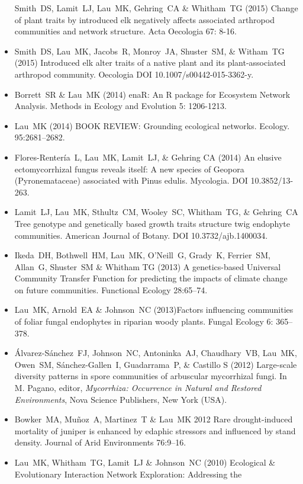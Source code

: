 \documentclass[a4paper]{article}
\begin{document}
\begin{itemize}
  Smith~DS, Lamit~LJ, Lau~MK, Gehring~CA \& Whitham~TG (2015) Change
  of plant traits by introduced elk negatively affects associated
  arthropod communities and network structure. Acta Oecologia 67: 8-16. 
\item 
  Smith~DS, Lau~MK, Jacobs~R, Monroy~JA, Shuster~SM, \& Witham~TG (2015)
  Introduced elk alter traits of a native plant and its plant-associated
  arthropod community. Oecologia DOI 10.1007/s00442-015-3362-y.
\item
  Borrett~SR \& Lau~MK (2014) enaR: An R package for Ecosystem Network
  Analysis. Methods in Ecology and Evolution 5: 1206-1213.
\item
  Lau~MK (2014) BOOK REVIEW: Grounding ecological networks. Ecology.
  95:2681--2682.
\item
  Flores-Rentería~L, Lau~MK, Lamit~LJ, \& Gehring CA (2014) An elusive
  ectomycorrhizal fungus reveals itself: A new species of Geopora
  (Pyronemataceae) associated with Pinus edulis. Mycologia. DOI
  10.3852/13-263.
\item
  Lamit~LJ, Lau~MK, Sthultz~CM, Wooley~SC, Whitham~TG, \& Gehring~CA
  Tree genotype and genetically based growth traits structure twig
  endophyte communities. American Journal of Botany. DOI 10.3732/ajb.1400034.
\item
  Ikeda~DH, Bothwell~HM, Lau~MK, O'Neill~G, Grady~K, Ferrier~SM,
  Allan~G, Shuster~SM \& Whitham TG (2013) A genetics-based Universal
  Community Transfer Function for predicting the impacts of climate
  change on future communities. Functional Ecology 28:65--74.
\item
  Lau~MK, Arnold~EA \& Johnson~NC (2013)Factors influencing communities
  of foliar fungal endophytes in riparian woody plants. Fungal Ecology
  6: 365--378.
\item
  Álvarez-Sánchez~FJ, Johnson~NC, Antoninka~AJ, Chaudhary~VB, Lau~MK,
  Owen~SM, Sánchez-Gallen~I, Guadarrama~P, \& Castillo S (2012)
  Large-scale diversity patterns in spore communities of arbuscular
  mycorrhizal fungi. In M. Pagano, editor, \emph{Mycorrhiza: Occurrence
  in Natural and Restored Environments}, Nova Science Publishers, New
  York (USA).
\item
  Bowker~MA, Muñoz~A, Martinez~T \& Lau~MK 2012 Rare drought-induced
  mortality of juniper is enhanced by edaphic stressors and influenced
  by stand density. Journal of Arid Environments 76:9--16.
\item
  Lau~MK, Whitham~TG, Lamit~LJ \& Johnson~NC (2010) Ecological \&
  Evolutionary Interaction Network Exploration: Addressing the

\end{itemize}
\end{document}
